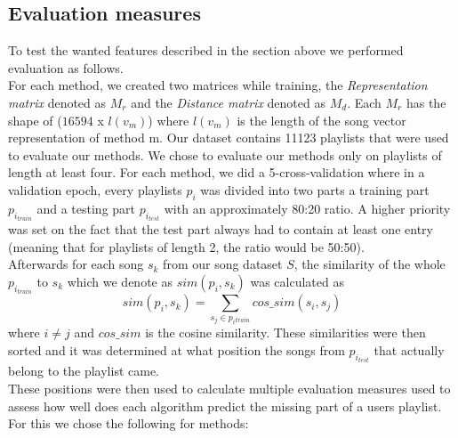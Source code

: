 \subsection{Evaluation measures}\label{ssec:evaluation_measures}
To test the wanted features described in the section above we performed evaluation as follows. \\
For each method, we created two matrices while training, the \textit{Representation matrix} denoted as  $M_r$ and the \textit{Distance matrix } denoted as $M_d$. Each $M_r$ has the shape of ($16594$ x $l(v_m) $) where $l(v_m)$ is the length of the song vector representation of method m. 
Our dataset contains 11123 playlists that were used to evaluate our methods. We chose to evaluate our methods only on playlists of length at least four. For each method, we did a 5-cross-validation where in a validation epoch, every playlists $p_i$ was divided into two parts a training part $p_{i_{train}}$ and a testing part $p_{i_{test}}$ with an approximately 80:20 ratio. A higher priority was set on the fact that the test part always had to contain at least one entry (meaning that for playlists of length 2, the ratio would be 50:50). \\
Afterwards for each song $ s_k $ from our song dataset $S$, the similarity of the whole $p_{i_{train}}$ to $s_k$ which we denote as $ sim(p_i, s_k) $ was calculated as $$ sim(p_i, s_k) =\sum_{s_j\in{p_i{_{train}}}} cos\_sim(s_i, s_j) $$ where $ i \neq j$ and $cos\_sim$ is the cosine similarity. These similarities were then sorted and it was determined at what position the songs from $p_{i_{test}} $ that actually belong to the playlist came. \\
These positions were then used to calculate multiple evaluation measures used to assess how well does each algorithm predict the missing part of a users playlist. For this we chose the following for methods:
